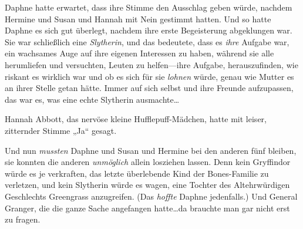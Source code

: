 Daphne hatte erwartet, dass ihre Stimme den Ausschlag geben würde, nachdem Hermine und Susan und Hannah mit Nein gestimmt hatten. Und so hatte Daphne es sich gut überlegt, nachdem ihre erste Begeisterung abgeklungen war. Sie war schließlich eine \emph{Slytherin}, und das bedeutete, dass es \emph{ihre} Aufgabe war, ein wachsames Auge auf ihre eigenen Interessen zu haben, während sie alle herumliefen und versuchten, Leuten zu helfen—ihre Aufgabe, herauszufinden, wie riskant es wirklich war und ob es sich für sie \emph{lohnen} würde, genau wie Mutter es an ihrer Stelle getan hätte. Immer auf sich selbst und ihre Freunde aufzupassen, das war es, was eine echte Slytherin ausmachte…

Hannah Abbott, das nervöse kleine Hufflepuff-Mädchen, hatte mit leiser, zitternder Stimme „Ja“ gesagt.

Und nun \emph{mussten} Daphne und Susan und Hermine bei den anderen fünf bleiben, sie konnten die anderen \emph{unmöglich} allein losziehen lassen. Denn kein Gryffindor würde es je verkraften, das letzte überlebende Kind der Bones-Familie zu verletzen, und kein Slytherin würde es wagen, eine Tochter des Altehrwürdigen Geschlechts Greengrass anzugreifen. (Das \emph{hoffte} Daphne jedenfalls.) Und General Granger, die die ganze Sache angefangen hatte…da brauchte man gar nicht erst zu fragen.

